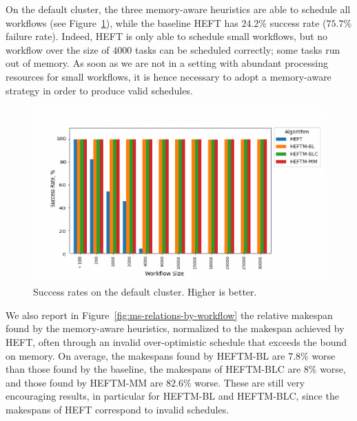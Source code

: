 \documentclass[conference]{IEEEtran}
\newcommand{\algo}[1]{\textsc{#1}}
\newcommand{\heft}{\algo{HEFT}\xspace}
\newcommand{\heftmm}{\algo{HEFTM-MM}\xspace}
\newcommand{\heftbl}{\algo{HEFTM-BL}\xspace}
\newcommand{\heftblc}{\algo{HEFTM-BLC}\xspace}
\begin{document}
    On the default cluster,  the three memory-aware heuristics are able to schedule all workflows
    (see Figure~\ref{fig:success-rates-large}), while
    the baseline \heft has $24.2\%$ success rate ($75.7\%$ failure rate).
    Indeed, \heft is only able to schedule small workflows, but no workflow over the size of $4000$ tasks
    can be scheduled correctly; some tasks run out of memory. As soon as we are not in a setting
    with abundant processing resources for small workflows, it is hence necessary to adopt
    a memory-aware strategy in order to produce valid schedules.

    \begin{figure}[tb]
        \centering
        \includegraphics[width=0.9\columnwidth] {images/success-rates-large}
        \caption{Success rates on the default cluster. Higher is better.}
        \label{fig:success-rates-large}
        \vspace{-0.3cm}
    \end{figure}

   We also report in  Figure~\ref{fig:ms-relations-by-workflow}  the relative makespan found
   by the memory-aware heuristics, normalized to the
   makespan achieved by \heft, often through an invalid over-optimistic schedule that exceeds
   the bound on memory.
    On average, the makespans found by \heftbl are $7.8\%$ worse than those found by the baseline,
    the makespans of \heftblc are $8\%$
    worse, and those found by \heftmm are $82.6\%$ worse. These are still very encouraging results,
    in particular for \heftbl and \heftblc, since the makespans of \heft correspond to invalid schedules.
\end{document}

